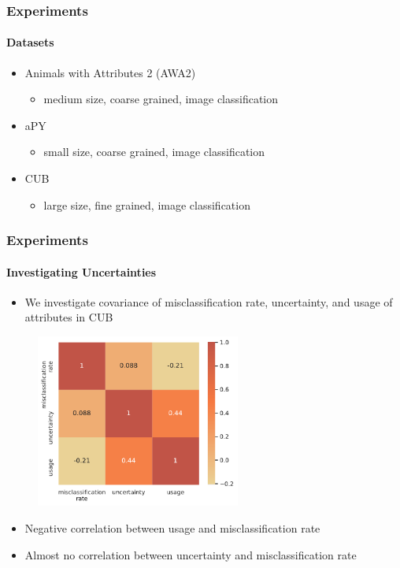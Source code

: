 \documentclass[9pt]{beamer}
\begin{document}
\begin{frame}
\frametitle{Experiments}
\framesubtitle{Datasets}
\begin{itemize}
	\item Animals with Attributes 2 (AWA2)
	\begin{itemize}
		\item medium size, coarse grained, image classification
	\end{itemize}
	\item aPY
	\begin{itemize}
		\item small size, coarse grained, image classification
	\end{itemize}	
	\item CUB
	\begin{itemize}
		\item large size, fine grained, image classification
	\end{itemize}
\end{itemize}
\end{frame}



\begin{frame}	
\frametitle{Experiments}
\framesubtitle{Investigating Uncertainties}
\begin{itemize}
	\item We investigate covariance of misclassification rate, uncertainty, and usage of attributes in CUB
\end{itemize} %
	\begin{figure}
		\centering
		\includegraphics[width=0.6\textwidth]{images/corr_matrix.pdf}
	\end{figure}
	\begin{itemize}
		\item Negative correlation between usage and misclassification rate
		\item Almost no correlation between uncertainty and misclassification rate
	\end{itemize}
\end{frame}
\end{document}
